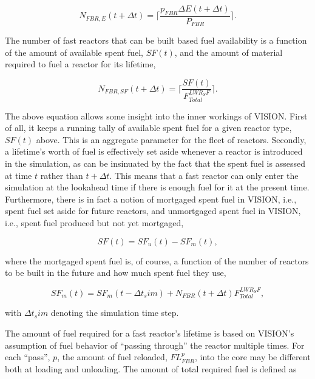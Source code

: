 \begin{equation*}
N_{FBR,E}\left(t+\Delta t\right) = 
                        \lceil \frac{p_{FBR} \Delta E (t + \Delta t)}
                                    {P_{FBR}} \rceil .
\end{equation*}

The number of fast reactors that can be built based fuel availability is a
function of the amount of available spent fuel, $SF(t)$, and the amount
of material required to fuel a reactor for its lifetime,

\begin{equation*}
N_{FBR,SF}\left(t+\Delta t\right) = 
                        \lceil \frac{SF(t)}
                                    {F^{LWR_SF}_{Total}} \rceil .
\end{equation*}

The above equation allows some insight into the inner workings of VISION. First
of all, it keeps a running tally of available spent fuel for a given reactor
type, $SF(t)$ above. This is an aggregate parameter for the fleet of
reactors. Secondly, a lifetime's worth of fuel is effectively set aside whenever
a reactor is introduced in the simulation, as can be insinuated by the fact that
the spent fuel is assessed at time $t$ rather than $t + \Delta t$. This means
that a fast reactor can only enter the simulation at the lookahead time if there
is enough fuel for it at the present time. Furthermore, there is in fact a
notion of mortgaged spent fuel in VISION, i.e., spent fuel set aside for future
reactors, and unmortgaged spent fuel in VISION, i.e., spent fuel produced but
not yet mortgaged,

\begin{equation*}
SF(t) = SF_u(t) - SF_m(t),
\end{equation*}

where the mortgaged spent fuel is, of course, a function of the number of
reactors to be built in the future and how much spent fuel they use,

\begin{equation*}
SF_m(t) = SF_m(t - \Delta t_sim) + N_{FBR}(t + \Delta t) F^{LWR_SF}_{Total},
\end{equation*}

with $\Delta t_sim$ denoting the simulation time step.

The amount of fuel required for a fast reactor's lifetime is based on VISION's
assumption of fuel behavior of ``passing through'' the reactor multiple
times. For each ``pass'', $p$, the amount of fuel reloaded, $FL^p_{FBR}$, into
the core may be different both at loading and unloading. The amount of total
required fuel is defined as

